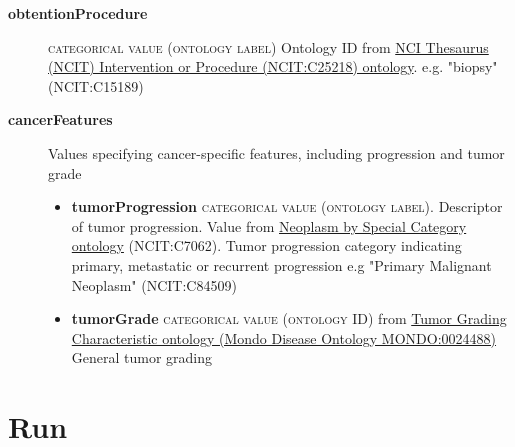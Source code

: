 \documentclass[a4paper, 10pt]{article}        %
\begin{document}
\begin{description}
	\item[\textbf{obtentionProcedure}] {\textsc{categorical value (ontology label)}} Ontology ID from \href{http://purl.obolibrary.org/obo/NCIT_C25218}{NCI Thesaurus (NCIT) Intervention or Procedure (NCIT:C25218) ontology}. e.g. "biopsy" (NCIT:C15189) %
	\item[\textbf{cancerFeatures}] Values specifying cancer-specific features, including progression and tumor grade
	\begin{itemize}
			\item[] \textbf{tumorProgression} {\textsc{categorical value (ontology label)}}. Descriptor of tumor progression. Value from \href{https://www.ebi.ac.uk/ols/ontologies/ncit/terms?iri=http%3A%2F%2Fpurl.obolibrary.org%2Fobo%2FNCIT_C7062&viewMode=All&siblings=false}{Neoplasm by Special Category ontology} (NCIT:C7062). Tumor progression category indicating primary, metastatic or recurrent progression  e.g "Primary Malignant Neoplasm" (NCIT:C84509)
			\item[] \textbf{tumorGrade} {\textsc{categorical value (ontology ID)}} from \href{https://www.ebi.ac.uk/ols/ontologies/mondo/terms?iri=http%3A%2F%2Fpurl.obolibrary.org%2Fobo%2FMONDO_0024488}{Tumor Grading Characteristic ontology (Mondo Disease Ontology MONDO:0024488)} General tumor grading  	
\end{itemize} 
 \end{description}
 


   \section*{ {\color{teal} Run}}
  
\end{document}
